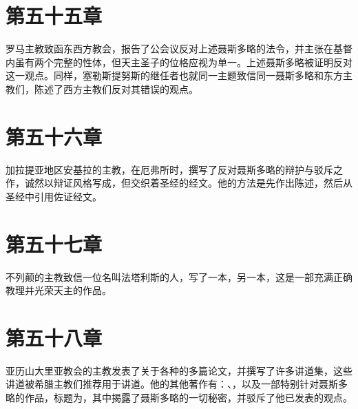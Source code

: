 
\section{第五十五章}

罗马主教致函东西方教会，报告了公会议反对上述聂斯多略的法令，并主张在基督内虽有两个完整的性体，但天主圣子的位格应视为单一。上述聂斯多略被证明反对这一观点。同样，塞勒斯提努斯的继任者也就同一主题致信同一聂斯多略和东方主教们，陈述了西方主教们反对其错误的观点。\par


\section{第五十六章}

加拉提亚地区安基拉的主教，在厄弗所时，撰写了反对聂斯多略的辩护与驳斥之作，诚然以辩证风格写成，但交织着圣经的经文。他的方法是先作出陈述，然后从圣经中引用佐证经文。\par


\section{第五十七章}

不列颠的主教致信一位名叫法塔利斯的人，写了一本，另一本，这是一部充满正确教理并光荣天主的作品。\par


\section{第五十八章}

亚历山大里亚教会的主教发表了关于各种的多篇论文，并撰写了许多讲道集，这些讲道被希腊主教们推荐用于讲道。他的其他著作有：、，以及一部特别针对聂斯多略的作品，标题为，其中揭露了聂斯多略的一切秘密，并驳斥了他已发表的观点。\par

